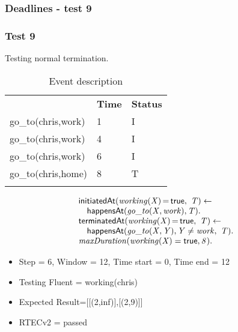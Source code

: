 \documentclass[8pt]{beamer}
\DeclareMathOperator{\val}{=}  %
\def \patsize {}
\def\happensAt{\textsf{\patsize happensAt}}
\def\initiatedAt{\textsf{\patsize initiatedAt}}
\def\terminatedAt{\textsf{\patsize terminatedAt}}
\def\true{\textsf{\patsize true}}
\newenvironment{mysplit}%
  {\arraycolsep 0pt \begin{array}{l}}%
  {\end{array}}
\begin{document}
\begin{frame}
    \frametitle{Deadlines - test 9}
    \subsubsection{Test 9}
    \small
    Testing normal termination.\linebreak
    \begin{minipage}{0.48\linewidth}
        \begin{table}[t!]
            \caption{Event description}
            \begin{center}

                \begin{tabular}{lll}
                    \hline\noalign{\smallskip}
                    \multicolumn{1}{l}{\textbf{Event}} & \multicolumn{1}{c}{\textbf{Time}} & \multicolumn{1}{c}{\textbf{Status}} \\
                    go\_to(chris,work)& 1 & I\\
                    go\_to(chris,work)& 4 & I\\
                    go\_to(chris,work)& 6 & I\\
                    go\_to(chris,home)& 8 & T\\
                    \noalign{\smallskip}
                    \hline
                \end{tabular}
            \end{center}
        \end{table}
    \end{minipage}
    \begin{minipage}{0.48\linewidth}
        \begin{align*}
            \begin{mysplit}
                \initiatedAt\mathit{(working(X)\val\true,\ T)\leftarrow}\\
                \quad    \happensAt\mathit{(go\_to(X,work),T)}.\\
                \terminatedAt\mathit{(working(X)\val\true,\ T) \leftarrow}\\
                \quad    \happensAt\mathit{(go\_to(X,Y),Y\neq work,\ T)}.\\
                \mathit{maxDuration(working(X)=\true,8)}.\\
            \end{mysplit}
        \end{align*}
    \end{minipage}
    \begin{itemize}
        \item  Step = 6, Window = 12, Time start = 0, Time end = 12
        \item Testing Fluent = working(chris)
        \item Expected Result=[[(2,inf)],[(2,9)]]
        \item RTECv2 = passed
    \end{itemize}
\end{frame}
\end{document}
